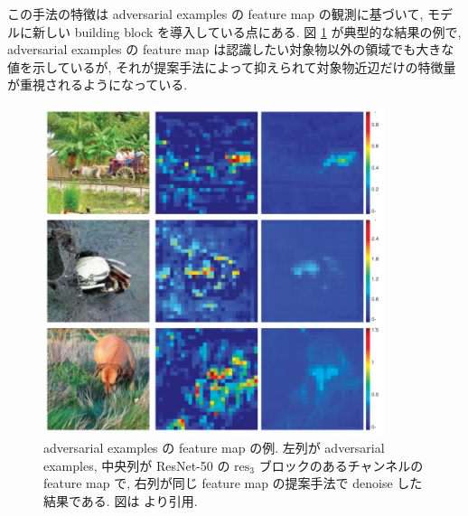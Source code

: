 この手法の特徴は adversarial examples の feature map の観測に基づいて, モデルに新しい building block を導入している点にある.
図 \ref{fig:feature-denoising-feature-map} が典型的な結果の例で, adversarial examples の feature map は認識したい対象物以外の領域でも大きな値を示しているが, それが提案手法によって抑えられて対象物近辺だけの特徴量が重視されるようになっている. 
%
\begin{figure}[htbp]
\begin{center}
\includegraphics[width=10.0cm]{figures/feature-denoising-feature-map.pdf}
\end{center}
\caption{
adversarial examples の feature map の例.
左列が adversarial examples, 中央列が ResNet-50 の $\text{res}_3$ ブロックのあるチャンネルの feature map で, 右列が同じ feature map の提案手法で denoise した結果である.
図は \cite{xie2019feature} より引用.
}
\label{fig:feature-denoising-feature-map}
\end{figure}
%

